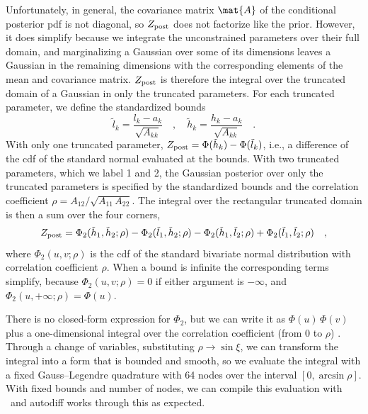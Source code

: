 \documentclass[twocolumn]{AASTeX7/aastex701}
\begin{document}
Unfortunately, in general, the covariance matrix $\mat{A}$ of the conditional posterior
pdf is not diagonal, so $Z_{\rm post}$ does not factorize like the prior.
However, it does simplify because we integrate the unconstrained parameters over their
full domain, and marginalizing a Gaussian over some of its dimensions leaves a Gaussian
in the remaining dimensions with the corresponding elements of the mean and covariance
matrix.
$Z_{\rm post}$ is therefore the integral over the truncated domain of a Gaussian in
only the truncated parameters.
For each truncated parameter, we define the standardized bounds
\begin{equation}
  \tilde{l}_k = \frac{l_k - a_k}{\sqrt{A_{kk}}}
  \quad , \quad
  \tilde{h}_k = \frac{h_k - a_k}{\sqrt{A_{kk}}}
  \quad .
\end{equation}
With only one truncated parameter,
$Z_{\rm post} = \Phi(\tilde{h}_k) - \Phi(\tilde{l}_k)$, i.e., a difference of the cdf of
the standard normal evaluated at the bounds.
With two truncated parameters, which we label 1 and 2, the Gaussian posterior over only
the truncated parameters is specified by the standardized bounds and the correlation
coefficient $\rho = A_{12} / \sqrt{A_{11}\,A_{22}}$.
The integral over the rectangular truncated domain is then a sum over the four corners,
\begin{equation}
  Z_{\rm post} =
    \Phi_2(\tilde{h}_1, \tilde{h}_2; \rho)
    - \Phi_2(\tilde{l}_1, \tilde{h}_2; \rho)
    - \Phi_2(\tilde{h}_1, \tilde{l}_2; \rho)
    + \Phi_2(\tilde{l}_1, \tilde{l}_2; \rho)
  \quad ,
  \label{eq:corners}
\end{equation}
where $\Phi_2(u, v; \rho)$ is the cdf of the standard bivariate normal distribution with
correlation coefficient $\rho$.
When a bound is infinite the corresponding terms simplify, because
$\Phi_2(u, v; \rho) = 0$ if either argument is $-\infty$, and
$\Phi_2(u, +\infty; \rho) = \Phi(u)$.

There is no closed-form expression for $\Phi_2$, but we can write it as
$\Phi(u)\,\Phi(v)$ plus a one-dimensional integral over the correlation coefficient
(from 0 to $\rho$) \citep{Plackett:1954}.
Through a change of variables, substituting $\rho \rightarrow \sin\xi$, we can transform
the integral into a form that is bounded and smooth, so we evaluate the integral with a
fixed Gauss--Legendre quadrature with 64 nodes over the interval $[0, \arcsin\rho]$.
With fixed bounds and number of nodes, we can compile this evaluation with \jax\ and
autodiff works through this as expected.
\end{document}
